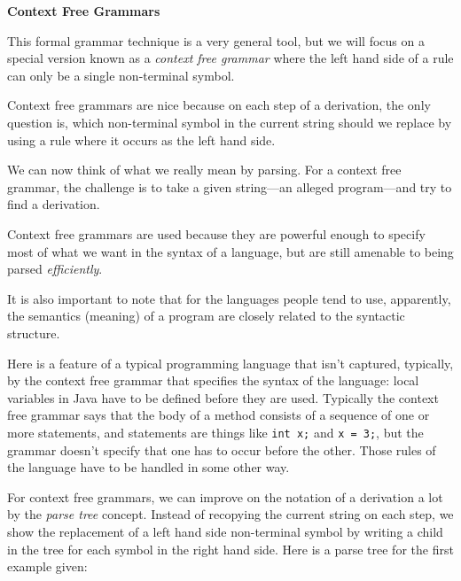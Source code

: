 {\bf Context Free Grammars}
\medskip

This formal grammar technique
is a very general tool, but we will focus on a special version known as a 
{\it context free grammar} where the left hand side of a rule can only be a single non-terminal
symbol.  
\medskip

Context free grammars are nice because on each step of a derivation, the only question is,
which non-terminal symbol in the current string should we replace by using a rule where
it occurs as the left hand side.    
\medskip

We can now think of what we really mean by parsing.  For a context free grammar, the
challenge is to take a given string---an alleged program---and try to find a derivation.
\medskip

Context free grammars are used because they are powerful enough to specify most of
what we want in the syntax of a language, but are still amenable to being parsed {\it efficiently}.
\medskip

It is also important to note that for the languages people  tend to use, apparently, the
semantics (meaning) of a program are closely related to the syntactic structure.  
\medskip

Here is a feature of a typical programming language that isn't captured, typically, by the
context free grammar that specifies the syntax of the language:  local variables in Java
have to be defined before they are used.  Typically the context free grammar
says that the body of a method consists of a sequence of one or more statements, and
statements are things like {\tt int x;} and {\tt x = 3;}, but the grammar doesn't specify that
one has to occur before the other.  Those rules of the language have to be handled in
some other way.
\medskip
\Outdent

For context free grammars, we can improve on the notation of a derivation a lot by
the {\it parse tree\/} concept.  Instead of recopying the current string on each step, we
show the replacement of a left hand side non-terminal symbol by writing a child in the
tree for each symbol in the right hand side.  Here is a parse tree for the first example
given:
\medskip

